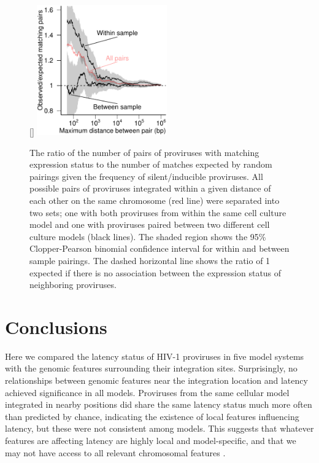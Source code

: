\documentclass[../sherrill-Mix_thesis.tex]{subfiles}
\begin{document}
	\begin{figure}
		\centering
			[\FBwidth]{
				\includegraphics[width=0.5\textwidth]{neighborMatch.pdf} %
			}{
				\caption[Shared expression status between near neighbors]{The ratio of the number of pairs of proviruses with matching expression status to the number of matches expected by random pairings given the frequency of silent/inducible proviruses. All possible pairs of proviruses integrated within a given distance of each other on the same chromosome (red line) were separated into two sets; one with both proviruses from within the same cell culture model and one with proviruses paired between two different cell culture models (black lines).  The shaded region shows the 95\% Clopper-Pearson binomial confidence interval for within and between sample pairings. The dashed horizontal line shows the ratio of 1 expected if there is no association between the expression status of neighboring proviruses.}
			\label{figNeighbor}
			}
	\end{figure}


\section{Conclusions}
	Here we compared the latency status of HIV-1 proviruses in five model systems with the genomic features surrounding their integration sites. Surprisingly, no relationships between genomic features near the integration location and latency achieved significance in all models. Proviruses from the same cellular model integrated in nearby positions did share the same latency status much more often than predicted by chance, indicating the existence of local features influencing latency, but these were not consistent among models. This suggests that whatever features are affecting latency are highly local and model-specific, and that we may not have access to all relevant chromosomal features \citep[e.g.\ ][]{Lassen2006, Dieudonne2009,Siliciano2011,Lusic2013}. %
\end{document}
